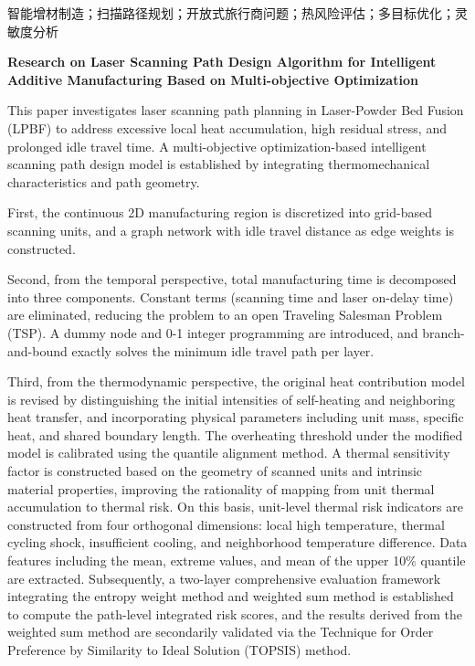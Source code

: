 \documentclass[a4paper, 12pt]{ctexart}
\newcommand{\sanhao}{\zihao{3}}
\newcommand{\sihao}{\zihao{4}}
\newcommand{\xiaosi}{\zihao{-4}}
\begin{document}
\vspace{1em}
\noindent{\xiaosi\heiti 关键词：} {\xiaosi\songti 智能增材制造；扫描路径规划；开放式旅行商问题；热风险评估；多目标优化；灵敏度分析} 

\newpage

\begin{center}
    {\sanhao\bfseries Research on Laser Scanning Path Design Algorithm for Intelligent Additive Manufacturing Based on Multi-objective Optimization}
\end{center}

\vspace{1em}

\noindent{\sihao\bfseries Abstract:}

{\xiaosi
This paper investigates laser scanning path planning in Laser-Powder Bed Fusion (LPBF) to address excessive local heat accumulation, high residual stress, and prolonged idle travel time. A multi-objective optimization-based intelligent scanning path design model is established by integrating thermomechanical characteristics and path geometry.

First, the continuous 2D manufacturing region is discretized into grid-based scanning units, and a graph network with idle travel distance as edge weights is constructed.

Second, from the temporal perspective, total manufacturing time is decomposed into three components. Constant terms (scanning time and laser on-delay time) are eliminated, reducing the problem to an open Traveling Salesman Problem (TSP). A dummy node and 0-1 integer programming are introduced, and branch-and-bound exactly solves the minimum idle travel path per layer.

Third, from the thermodynamic perspective, the original heat contribution model is revised by distinguishing the initial intensities of self-heating and neighboring heat transfer, and incorporating physical parameters including unit mass, specific heat, and shared boundary length. The overheating threshold under the modified model is calibrated using the quantile alignment method. A thermal sensitivity factor is constructed based on the geometry of scanned units and intrinsic material properties, improving the rationality of mapping from unit thermal accumulation to thermal risk. On this basis, unit-level thermal risk indicators are constructed from four orthogonal dimensions: local high temperature, thermal cycling shock, insufficient cooling, and neighborhood temperature difference. Data features including the mean, extreme values, and mean of the upper 10\% quantile are extracted. Subsequently, a two-layer comprehensive evaluation framework integrating the entropy weight method and weighted sum method is established to compute the path-level integrated risk scores, and the results derived from the weighted sum method are secondarily validated via the Technique for Order Preference by Similarity to Ideal Solution (TOPSIS) method.

}
\end{document}
